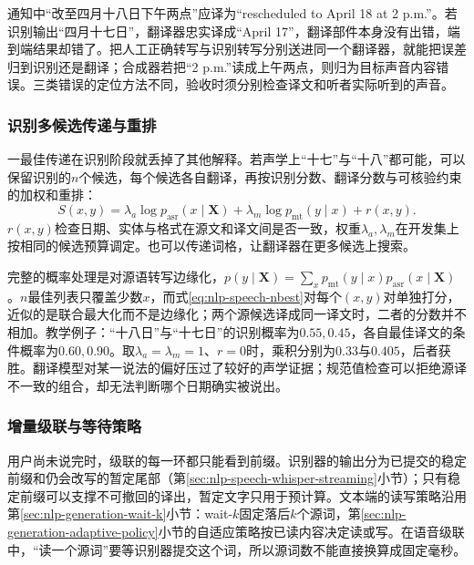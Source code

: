 通知中“改至四月十八日下午两点”应译为“rescheduled to April 18 at 2 p.m.”。若识别输出“四月十七日”，翻译器忠实译成“April 17”，翻译部件本身没有出错，端到端结果却错了。把人工正确转写与识别转写分别送进同一个翻译器，就能把误差归到识别还是翻译；合成器若把“2 p.m.”读成上午两点，则归为目标声音内容错误。三类错误的定位方法不同，验收时须分别检查译文和听者实际听到的声音。

\subsubsection{识别多候选传递与重排}
\label{sec:nlp-speech-nbest-translation}

一最佳传递在识别阶段就丢掉了其他解释。若声学上“十七”与“十八”都可能，可以保留识别的$n$个候选，每个候选各自翻译，再按识别分数、翻译分数与可核验约束的加权和重排：
\begin{equation}
 S(x,y)=\lambda_a\log p_{\mathrm{asr}}(x\mid\bm{X})
        +\lambda_m\log p_{\mathrm{mt}}(y\mid x)+r(x,y).
 \label{eq:nlp-speech-nbest}
\end{equation}
$r(x,y)$检查日期、实体与格式在源文和译文间是否一致，权重$\lambda_a,\lambda_m$在开发集上按相同的候选预算调定。也可以传递词格，让翻译器在更多候选上搜索。

完整的概率处理是对源语转写边缘化，$p(y\mid\bm{X})=\sum_xp_{\mathrm{mt}}(y\mid x)p_{\mathrm{asr}}(x\mid\bm{X})$。$n$最佳列表只覆盖少数$x$，而式\eqref{eq:nlp-speech-nbest}对每个$(x,y)$对单独打分，近似的是联合最大化而不是边缘化；两个源候选译成同一译文时，二者的分数并不相加。教学例子：“十八日”与“十七日”的识别概率为$0.55,0.45$，各自最佳译文的条件概率为$0.60,0.90$。取$\lambda_a=\lambda_m=1$、$r=0$时，乘积分别为$0.33$与$0.405$，后者获胜。翻译模型对某一说法的偏好压过了较好的声学证据；规范值检查可以拒绝源译不一致的组合，却无法判断哪个日期确实被说出。

\subsubsection{增量级联与等待策略}
\label{sec:nlp-speech-incremental-cascade}

用户尚未说完时，级联的每一环都只能看到前缀。识别器的输出分为已提交的稳定前缀和仍会改写的暂定尾部（第\ref{sec:nlp-speech-whisper-streaming}小节）；只有稳定前缀可以支撑不可撤回的译出，暂定文字只用于预计算。文本端的读写策略沿用第\ref{sec:nlp-generation-wait-k}小节：wait-$k$固定落后$k$个源词，第\ref{sec:nlp-generation-adaptive-policy}小节的自适应策略按已读内容决定读或写。在语音级联中，“读一个源词”要等识别器提交这个词，所以源词数不能直接换算成固定毫秒。

